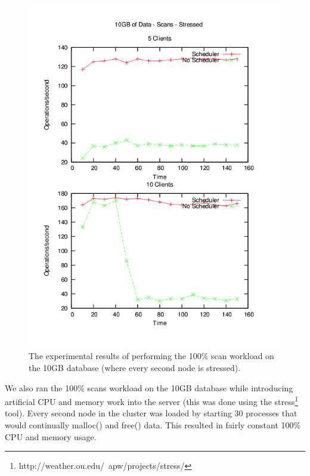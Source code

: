 \begin{figure}[t]
\centering
\includegraphics[scale=0.4]{images/10GB_Scans_Stressed.png}
\vspace{-15pt}
\caption{The experimental results of performing the 100\% scan workload on the 10GB database (where every second node is stressed).}
\label{fig:10g_scans_stressed}
\end{figure}

We also ran the 100\% scans workload on the 10GB database while introducing artificial CPU and memory work into the server (this was done using the stress\footnote{ http://weather.ou.edu/~apw/projects/stress/} tool). Every second node in the cluster was loaded by starting 30 processes that would continually malloc() and free() data. This resulted in fairly constant 100\% CPU and memory usage.

